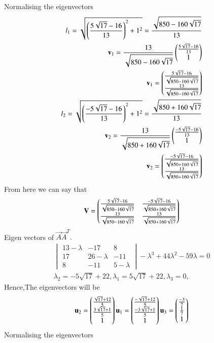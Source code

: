 \documentclass[journal,12pt,twocolumn]{IEEEtran}
\begin{document}
Normalising the eigenvectors
\begin{align}
l_1=\sqrt{\left(\frac{5\sqrt{17}-16}{13}\right)^2+1^2}=\frac{\sqrt{850-160\sqrt{17}}}{13}\\
\mathbf{v}_1=\frac{13}{\sqrt{850-160\sqrt{17}}}\begin{pmatrix}\frac{5\sqrt{17}-16}{13}\\1\end{pmatrix}\\
\mathbf{v}_1=\begin{pmatrix}\frac{5\sqrt{17}-16}{\sqrt{850-160\sqrt{17}}}\\\frac{13}{\sqrt{850-160\sqrt{17}}}\end{pmatrix}\\
l_2=\sqrt{\left(\frac{-5\sqrt{17}-16}{13}\right)^2+1^2}=\frac{\sqrt{850+160\sqrt{17}}}{13}\\
\mathbf{v}_2=\frac{13}{\sqrt{850+160\sqrt{17}}}\begin{pmatrix}\frac{-5\sqrt{17}-16}{13}\\1\end{pmatrix}\\
\mathbf{v}_2=\begin{pmatrix}\frac{-5\sqrt{17}-16}{\sqrt{850+160\sqrt{17}}}\\\frac{13}{\sqrt{850+160\sqrt{17}}}\end{pmatrix}
\end{align}
From here we can say that
\begin{align}
\mathbf{V}=\begin{pmatrix}\frac{5\sqrt{17}-16}{\sqrt{850-160\sqrt{17}}}&\frac{-5\sqrt{17}-16}{\sqrt{850+160\sqrt{17}}}\\\frac{13}{\sqrt{850-160\sqrt{17}}}&\frac{13}{\sqrt{850+160\sqrt{17}}}\end{pmatrix}
\end{align}
Eigen vectors of $\vec{A}$$\vec{A}^T.$
\begin{align}
\begin{vmatrix}
13-\lambda&-17&8\\17&26-\lambda&-11\\8&-11&5-\lambda
\end{vmatrix}
-\lambda^3+44\lambda^2-59\lambda=0\\
\lambda_2=-5\sqrt{17}+22,\lambda_1=5\sqrt{17}+22,\lambda_3=0,
\end{align}
Hence,The eigenvectors will be
\begin{align}
\mathbf{u}_2=\begin{pmatrix}\frac{\sqrt{17}+12}{5}\\\frac{3\sqrt{17}+1}{5}\\1\end{pmatrix}
\mathbf{u}_1=\begin{pmatrix}\frac{-\sqrt{17}+12}{5}\\\frac{-3\sqrt{17}+1}{5}\\1\end{pmatrix}
\mathbf{u}_3=\begin{pmatrix}\frac{-3}{7}\\\frac{1}{7}\\1\end{pmatrix}
\end{align}
Normalising the eigenvectors
\end{document}
